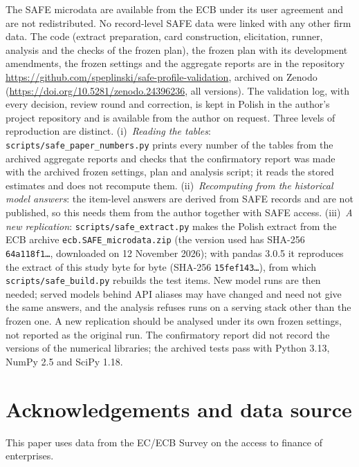 \documentclass[11pt]{article}
\begin{document}
The SAFE microdata are available from the ECB under its user agreement and are not redistributed. No record-level
SAFE data were linked with any other firm data. The code (extract preparation, card construction, elicitation, runner,
analysis and the checks of the frozen plan), the frozen plan with its development amendments, the frozen settings and
the aggregate reports are in the repository \url{https://github.com/speplinski/safe-profile-validation}, archived on
Zenodo (\url{https://doi.org/10.5281/zenodo.24396236}, all versions). The validation log, with every decision, review
round and correction, is kept in Polish in the author's project repository and is available from the author on request. Three levels of reproduction are distinct.
(i)~\emph{Reading the tables}: \texttt{scripts/safe\_paper\_numbers.py} prints every number of the tables from the
archived aggregate reports and checks that the confirmatory report was made with the archived frozen settings, plan
and analysis script; it reads the stored estimates and does not recompute them. (ii)~\emph{Recomputing from the
historical model answers}: the item-level answers are derived from SAFE records and are not published, so this needs
them from the author together with SAFE access. (iii)~\emph{A new replication}: \texttt{scripts/safe\_extract.py}
makes the Polish extract from the ECB archive \texttt{ecb.SAFE\_microdata.zip} (the version used has SHA-256
\texttt{64a118f1\ldots}, downloaded on 12 November 2026); with pandas 3.0.5 it reproduces the extract of this study
byte for byte (SHA-256 \texttt{15fef143\ldots}), from which \texttt{scripts/safe\_build.py} rebuilds the test items.
New model runs are then needed; served models behind API aliases may have changed and need not give the same answers,
and the analysis refuses runs on a serving stack other than the frozen one. A new replication should be analysed
under its own frozen settings, not reported as the original run. The confirmatory report did not record the versions
of the numerical libraries; the archived tests pass with Python 3.13, NumPy 2.5 and SciPy 1.18.

\section*{Acknowledgements and data source}

This paper uses data from the EC/ECB Survey on the access to finance of enterprises.
\end{document}
